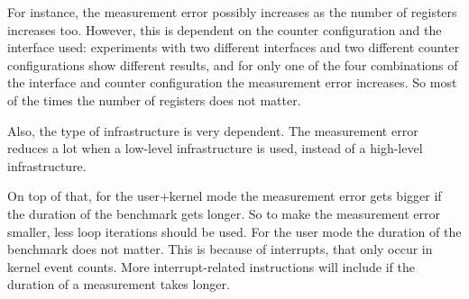 For instance, the measurement error possibly increases as the number of registers increases too. However, this is dependent on the counter configuration and the interface used: experiments with two different interfaces and two different counter configurations show different results, and for only one of the four combinations of the interface and counter configuration the measurement error increases\cite{AccuracyPerformanceCounter}. So most of the times the number of registers does not matter.

Also, the type of infrastructure is very dependent. The measurement error reduces a lot when a low-level infrastructure is used, instead of a high-level infrastructure\cite{AccuracyPerformanceCounter}.

On top of that, for the user+kernel mode the measurement error gets bigger if the duration of the benchmark gets longer\cite{AccuracyPerformanceCounter}. So to make the measurement error smaller, less loop iterations should be used.  For the user mode the duration of the benchmark does not matter. This is because of interrupts, that only occur in kernel event counts. More interrupt-related instructions will include if the duration of a measurement takes longer.
